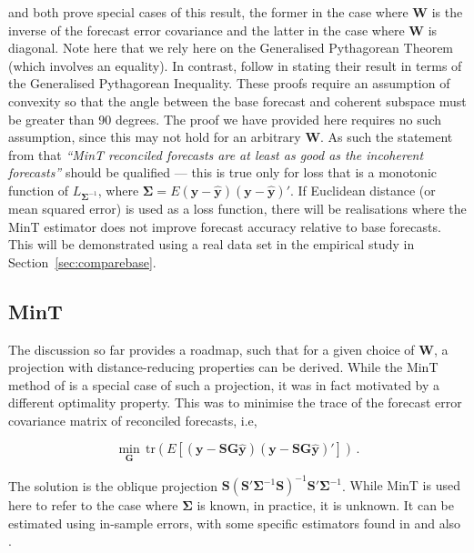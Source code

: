 \documentclass[12pt]{article}
\theoremstyle{definition}
\begin{document}
\citet{WicEtAl2019} and \citet{VanErven2015a} both prove special cases of this result, the former in the case where $\bm{W}$ is the inverse of the forecast error covariance and the latter in the case where $\bm{W}$ is diagonal.  Note here that we rely here on the Generalised Pythagorean Theorem (which involves an equality). In contrast, \citet{WicEtAl2019} follow \citet{VanErven2015a} in stating their result in terms of the Generalised Pythagorean Inequality. These proofs require an assumption of convexity so that the angle between the base forecast and coherent subspace must be greater than 90 degrees. The proof we have provided here requires no such assumption, since this may not hold for an arbitrary $\bm{W}$. As such the statement from \citet{WicEtAl2019} that \emph{``MinT reconciled forecasts are at least as good as the incoherent forecasts''} should be qualified --- this is true only for loss {\color{blue}that is a monotonic function of $L_{\bm{\Sigma}^{-1}}$, where $\bm{\Sigma}=E(\bm{y}-\hat{\bm{y}})(\bm{y}-\hat{\bm{y}})'$}. If Euclidean distance (or mean squared error) is used {\color{blue} as a loss function}, there will be realisations where the MinT estimator does not improve forecast accuracy relative to base forecasts. This will be demonstrated using a real data set in the empirical study in Section~\ref{sec:comparebase}.

\subsection{MinT}

{\color{blue}The discussion so far provides a roadmap, such that for a given choice of $\bm{W}$, a projection with distance-reducing properties can be derived}. While the MinT method of \citet{WicEtAl2019} {\color{blue} is a special case of such a projection, it was in fact motivated by a different optimality property.  This was to minimise the} trace of the forecast error covariance matrix of reconciled forecasts, i.e,
	
{\color{blue}
\begin{equation}
\label{eq:MinTObj}
\underset{\bm{G}}{\min}\,\textrm{tr}(E\left[(\bm{y}-{\bm S}{\bm G}\hat{\bm{y}})(\bm{y}-{\bm S}{\bm G}\hat{\bm{y}})'\right])\,.
\end{equation}
}

The solution is the oblique projection {\color{blue} $\bm{S}\left(\bm{S}'\bm{\Sigma}^{-1}\bm{S}\right)^{-1}\bm{S}'\bm{\Sigma}^{-1}$}. {\color{blue} While MinT is used here to refer to the case where $\bm{\Sigma}$ is known, in practice,} it is unknown.  It can be estimated using in-sample errors, {\color{blue} with some specific estimators found in \cite{WicEtAl2019} and also \cite{NysEtAl2019}.}
\end{document}
